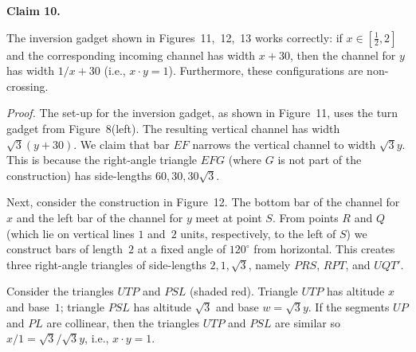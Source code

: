 \documentclass{article}
\begin{document}
\par\medskip\noindent\textbf{Claim 10.} \begin{itshape}

The inversion gadget shown in Figures~11,~12,~13 works correctly:
if $x \in [\frac{1}{2},2]$ and the corresponding incoming channel has width $x + 30$,  then the channel for $y$ has width $1/x + 30$ (i.e., $x \cdot y = 1$).  Furthermore, these configurations are non-crossing. 
\end{itshape}\par\medskip
\par\noindent\textit{Proof.} 
The set-up for the inversion gadget, as shown in Figure~11, uses the turn gadget from Figure~8(left).
The resulting vertical channel has width $\sqrt{3}(y + 30)$. 
We claim that bar $EF$ narrows the vertical channel to width $\sqrt{3}y$.  This is because the right-angle triangle $EFG$ (where $G$ is not part of the construction) has side-lengths $60,30,30\sqrt{3}$.

Next, consider the construction in Figure~12. The bottom bar of the channel for $x$ and the left bar of the channel for $y$ meet at point $S$.  From points $R$ and $Q$ (which lie on vertical lines $1$ and~$2$ units, respectively, to the left of $S$) we construct bars of length~$2$ at a fixed angle of $120^\circ$ from horizontal.  
This creates three right-angle triangles of side-lengths $2,1,\sqrt{3}$, namely
$PRS$, $RPT$, and $UQT'$.

Consider the triangles $UTP$ and $PSL$ (shaded red).
Triangle $UTP$ has altitude $x$ and base~$1$; triangle $PSL$ has altitude $\sqrt 3$ and base $w = \sqrt{3} y$.
If the segments $UP$ and $PL$ are 
collinear, then the triangles $UTP$ and $PSL$ are similar so
$x / 1 = \sqrt{3} / \sqrt{3} y$, i.e., $x \cdot y = 1$.
\end{document}
